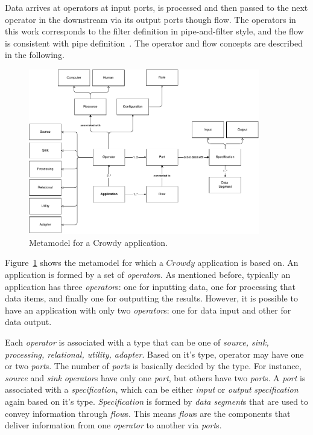 Data arrives at operators at input ports, is processed and then passed to the next operator 
in the downstream via its output ports though flow. The operators in this work corresponds 
to the filter definition in pipe-and-filter style, and the flow is consistent with pipe 
definition~\cite{Clements}. The operator and flow concepts are described in the following. 

\begin{figure}[ht]
	\centering
	\includegraphics[width=0.9\textwidth]{figures/ApplicationMetamodel.pdf}
	\caption{Metamodel for a Crowdy application.}
	\label{fig:metamodel}
\end{figure}

Figure~\ref{fig:metamodel} shows the metamodel for which a $Crowdy$ application is 
based on. An application is formed by a set of \textit{operator}s. As mentioned before, 
typically an application has three \textit{operator}s: one for inputting data, one for processing 
that data items, and finally one for outputting the results. However, it is possible to 
have an application with only two \textit{operator}s: one for data input and other for data 
output.

Each \textit{operator} is associated with a type that can be one of \textit{source, sink, 
processing, relational, utility, adapter}. Based on it's type, operator may have 
one or two \textit{port}s. The number of \textit{port}s is basically decided by the type. 
For instance, \textit{source} and \textit{sink} \textit{operator}s have only one \textit{port}, 
but others have two \textit{port}s. A \textit{port} is associated with a \textit{specification}, 
which can be either \textit{input} or \textit{output} \textit{specification} again based on 
it's type. \textit{Specification} is formed by \textit{data segment}s that are used to 
convey information through \textit{flow}s. This means \textit{flow}s are the 
components that deliver information from one \textit{operator} to another via \textit{port}s.

